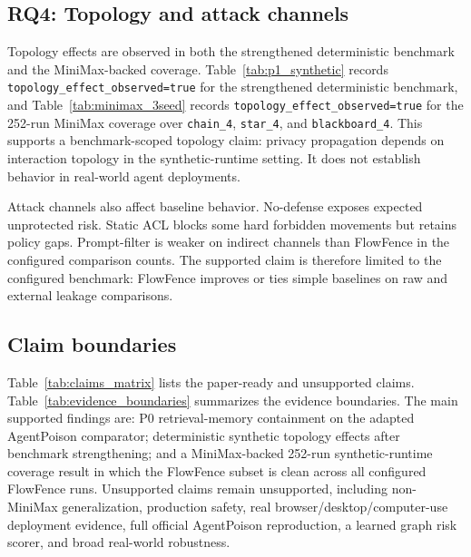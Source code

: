\subsection{RQ4: Topology and attack channels}

Topology effects are observed in both the strengthened deterministic benchmark and the MiniMax-backed coverage. Table~\ref{tab:p1_synthetic} records \texttt{topology\_effect\_observed=true} for the strengthened deterministic benchmark, and Table~\ref{tab:minimax_3seed} records \texttt{topology\_effect\_observed=true} for the 252-run MiniMax coverage over \texttt{chain\_4}, \texttt{star\_4}, and \texttt{blackboard\_4}. This supports a benchmark-scoped topology claim: privacy propagation depends on interaction topology in the synthetic-runtime setting. It does not establish behavior in real-world agent deployments.

Attack channels also affect baseline behavior. No-defense exposes expected unprotected risk. Static ACL blocks some hard forbidden movements but retains policy gaps. Prompt-filter is weaker on indirect channels than FlowFence in the configured comparison counts. The supported claim is therefore limited to the configured benchmark: FlowFence improves or ties simple baselines on raw and external leakage comparisons.

\subsection{Claim boundaries}

Table~\ref{tab:claims_matrix} lists the paper-ready and unsupported claims. Table~\ref{tab:evidence_boundaries} summarizes the evidence boundaries. The main supported findings are: P0 retrieval-memory containment on the adapted AgentPoison comparator; deterministic synthetic topology effects after benchmark strengthening; and a MiniMax-backed 252-run synthetic-runtime coverage result in which the FlowFence subset is clean across all configured FlowFence runs. Unsupported claims remain unsupported, including non-MiniMax generalization, production safety, real browser/desktop/computer-use deployment evidence, full official AgentPoison reproduction, a learned graph risk scorer, and broad real-world robustness.

